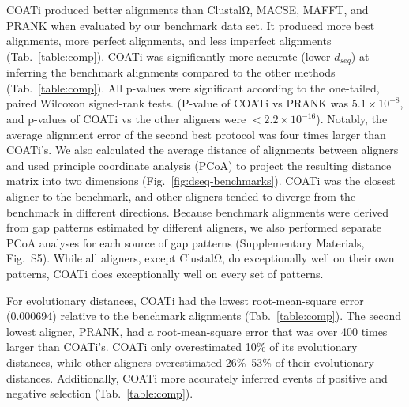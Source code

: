 \documentclass[12pt,letterpaper]{article}
\begin{document}
COATi produced better alignments than ClustalΩ, MACSE, MAFFT, and PRANK when evaluated by our benchmark data set. It produced more best alignments, more perfect alignments, and less imperfect alignments (Tab.~\ref{table:comp}).
%
COATi was significantly more accurate (lower $d_{seq}$) at inferring the benchmark alignments compared to the other methods (Tab.~\ref{table:comp}). All p-values were significant according to the one-tailed, paired Wilcoxon signed-rank tests. (P-value of COATi vs PRANK was $5.1 \times 10^{-8}$, and p-values of COATi vs the other aligners were $< 2.2 \times 10^{-16}$). Notably, the average alignment error of the second best protocol was four times larger than COATi's. We also calculated the average distance of alignments between aligners and used principle coordinate analysis (PCoA) to project the resulting distance matrix into two dimensions (Fig.~\ref{fig:dseq-benchmarks}). COATi was the closest aligner to the benchmark, and other aligners tended to diverge from the benchmark in different directions. Because benchmark alignments were derived from gap patterns estimated by different aligners, we also performed separate PCoA analyses for each source of gap patterns (Supplementary Materials, Fig.~S5). While all aligners, except ClustalΩ, do exceptionally well on their own patterns, COATi does exceptionally well on every set of patterns.

For evolutionary distances, COATi had the lowest root-mean-square error (0.000694) relative to the benchmark alignments (Tab.~\ref{table:comp}). The second lowest aligner, PRANK, had a root-mean-square error that was over 400 times larger than COATi's. COATi only overestimated  10\% of its evolutionary distances, while other aligners overestimated 26\%--53\% of their evolutionary distances.
%
Additionally, COATi more accurately inferred events of positive and negative selection (Tab.~\ref{table:comp}).
\end{document}
